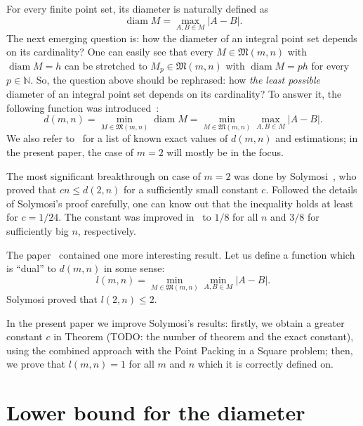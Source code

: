 \documentclass[a4paper,14pt]{article} %
\theoremstyle{plain}
\begin{document}
For every finite point set, its diameter is naturally defined as
\begin{equation}
	\operatorname{diam} M = \max_{A,B\in M} |A-B|
	.
\end{equation}
The next emerging question is: how the diameter of an integral point set depends on its cardinality?
One can easily see that every $M\in\mathfrak{M}(m,n)$ with $\operatorname{diam} M = h$
can be stretched to $M_p\in\mathfrak{M}(m,n)$ with $\operatorname{diam} M = ph$
for every $p\in\mathbb{N}$.
So, the question above should be rephrased:
how \textit{the least possible} diameter of an integral point set depends on its cardinality?
To answer it, the following function was introduced~\cite{kurz2008bounds,kurz2008minimum}:
\begin{equation}
	d(m,n) = \min_{M\in\mathfrak{M}(m,n)} \operatorname{diam} M = \min_{M\in\mathfrak{M}(m,n)} \max_{A,B\in M} |A-B|
	.
\end{equation}
We also refer to~\cite{kurz2008bounds} for a list of known exact values of $d(m,n)$
and estimations; in the present paper, the case of $m=2$ will mostly be in the focus.

The most significant breakthrough on case of $m=2$ was done by Solymosi~\cite{solymosi2003note},
who proved that $cn \leq d(2,n)$ for a sufficiently small constant $c$.
Followed the details of Solymosi's proof carefully,
one can know out that the inequality holds at least for $c = 1/24$.
The constant was improved in~\cite{our-mz-rus,our-vmmsh-2018}
to $1/8$ for all $n$ and $3/8$ for sufficiently big $n$, respectively.

The paper~\cite{solymosi2003note} contained one more interesting result.
Let us define a function which is ``dual'' to $d(m,n)$ in some sense:
\begin{equation}
	l(m,n) = \min_{M\in\mathfrak{M}(m,n)} \min_{A,B\in M} |A-B|
	.
\end{equation}
Solymosi proved that $l(2,n)\leq 2$.

In the present paper we improve Solymosi's results:
firstly, we obtain a greater constant $c$ in Theorem (TODO: the number of theorem and the exact constant),
using the combined approach with the Point Packing in a Square problem;
then, we prove that $l(m,n)=1$ for all $m$ and $n$ which it is correctly defined on.


\section{Lower bound for the diameter}
\end{document}
